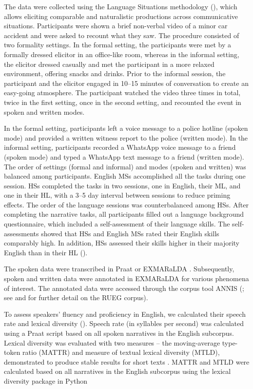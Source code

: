 \documentclass[output=paper,colorlinks,citecolor=brown]{langscibook}
\begin{document}
The data were collected using the Language Situations methodology (\cite{chapters/02, wiese_2020_langsit}), which allows eliciting comparable and naturalistic productions across communicative situations. Participants were shown a brief non-verbal video of a minor car accident and were asked to recount what they saw. The procedure consisted of two formality settings. In the formal setting, the participants were met by a formally dressed elicitor in an office-like room, whereas in the informal setting, the elicitor dressed casually and met the participant in a more relaxed environment, offering snacks and drinks. Prior to the informal session, the participant and the elicitor engaged in 10--15 minutes of conversation to create an easy-going atmosphere. The participant watched the video three times in total, twice in the first setting, once in the second setting, and recounted the event in spoken and written modes.

In the formal setting, participants left a voice message to a police hotline (spoken mode) and provided a written witness report to the police (written mode). In the informal setting, participants recorded a WhatsApp voice message to a friend (spoken mode) and typed a WhatsApp text message to a friend (written mode). The order of settings (formal and informal) and modes (spoken and written) was balanced among participants. English MSs accomplished all the tasks during one session. HSs completed the tasks in two sessions, one in English, their ML, and one in their HL, with a 3--5 day interval between sessions to reduce priming effects. The order of the language sessions was counterbalanced among HSs. After completing the narrative tasks, all participants filled out a language background questionnaire, which included a self-assessment of their language skills. The self-assessments showed that HSs and English MSs rated their English skills comparably high. In addition, HSs assessed their skills higher in their majority English than in their HL ().

The spoken data were transcribed in Praat \parencite{Boersma2001} or EXMARaLDA \parencite{schmidt2014}. Subsequently, spoken and written data were annotated in EXMARaLDA for various phenomena of interest. The annotated data were accessed through the corpus tool ANNIS (\cite{krause20160}; see \cite{chapters/03} and \citet{Klotzetal2024} for further detail on the RUEG corpus).

To assess speakers’ fluency and proficiency in English, we calculated their speech rate and lexical diversity (). Speech rate (in syllables per second) was calculated using a Praat script \parencite{DeJong2021} based on all spoken narratives in the English subcorpus. Lexical diversity was evaluated with two measures -- the moving-average type-token ratio (MATTR) and measure of textual lexical diversity (MTLD), demonstrated to produce stable results for short texts \parencite{Zenker2021}. MATTR and MTLD were calculated based on all narratives in the English subcorpus using the lexical diversity package in Python \parencite{kyle_lex_div_2020}
\end{document}
